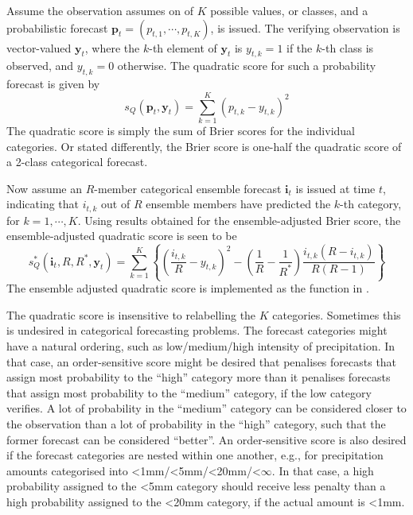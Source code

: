 \documentclass[article]{jss}
\begin{document}
Assume the observation assumes on of $K$ possible values, or classes, and a probabilistic forecast $\mathbf{p}_t = (p_{t,1}, \cdots, p_{t,K})$, is issued.
The verifying observation is vector-valued $\mathbf{y}_t$, where the $k$-th element of $\mathbf{y}_t$ is $y_{t,k}=1$ if the $k$-th class is observed, and $y_{t,k}=0$ otherwise.
The quadratic score for such a probability forecast is given by
%
\begin{equation}
s_{Q}(\mathbf{p}_t, \mathbf{y}_t) = \sum_{k=1}^K \left(p_{t,k} - y_{t,k}\right)^2
\end{equation}
%
The quadratic score is simply the sum of Brier scores for the individual categories.
Or stated differently, the Brier score is one-half the quadratic score of a 2-class categorical forecast.

Now assume an $R$-member categorical ensemble forecast $\mathbf{i}_t$ is issued at time $t$, indicating that $i_{t,k}$ out of $R$ ensemble members have predicted the $k$-th category, for $k=1,\cdots,K$.
Using results obtained for the ensemble-adjusted Brier score, the ensemble-adjusted quadratic score is seen to be
%
\begin{equation}
s_{Q}^*(\mathbf{i}_t, R, R^*, \mathbf{y}_t) = \sum_{k=1}^K \left\{ \left(\frac{i_{t,k}}{R} - y_{t,k}\right)^2 - \left(\frac{1}{R} - \frac{1}{R^*}\right) \frac{i_{t,k}(R-i_{t,k})}{R(R-1)}\right\}
\end{equation}
%
The ensemble adjusted quadratic score is implemented as the function  in .


The quadratic score is insensitive to relabelling the $K$ categories.
Sometimes this is undesired in categorical forecasting problems. 
The forecast categories might have a natural ordering, such as low/medium/high intensity of precipitation.
In that case, an order-sensitive score might be desired that penalises forecasts that assign most probability to the ``high'' category more than it penalises forecasts that assign most probability to the ``medium'' category, if the low category verifies. 
A lot of probability in the ``medium'' category can be considered closer to the observation than a lot of probability in the ``high'' category, such that the former forecast can be considered ``better''.
An order-sensitive score is also desired if the forecast categories are nested within one another, e.g., for precipitation amounts categorised into <1mm/<5mm/<20mm/<$\infty$.
In that case, a high probability assigned to the <5mm category should receive less penalty than a high probability assigned to the <20mm category, if the actual amount is <1mm.
\end{document}

